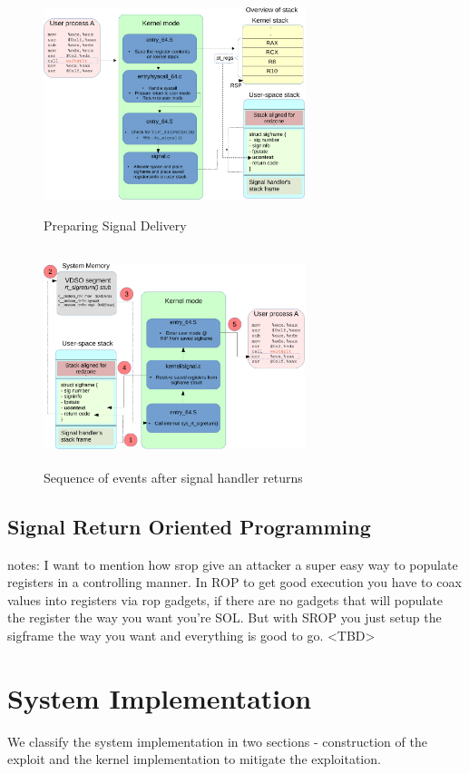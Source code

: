 \documentclass{sig-alternate-05-2015}
\begin{document}
\begin{figure}
\centering
\includegraphics[height=2.5in, width=3in]{3.pdf}
\caption{Preparing Signal Delivery}
\label{fig:sig1}
\end{figure}

\begin{figure}
\centering
\includegraphics[height=2.5in, width=3in]{4.pdf}
\caption{Sequence of events after signal handler returns}
\label{fig:sig2}
\end{figure}

\subsection{Signal Return Oriented Programming}
notes: 
I want to mention how srop give an attacker a super easy way to populate registers in a controlling manner. In ROP to get good execution you have to coax values into registers via rop gadgets, if there are no gadgets that will populate the register the way you want you're SOL. But with SROP you just setup the sigframe the way you want and everything is good to go.
<TBD>
\section {System Implementation}
We classify the system implementation in two sections - construction
of the exploit and the kernel implementation to mitigate the exploitation.
\end{document}
